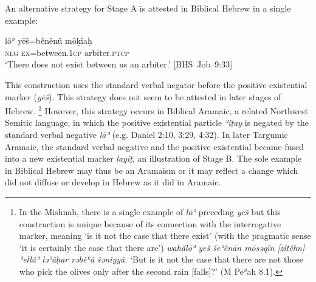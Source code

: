 ﻿\documentclass[output=paper]{langsci/langscibook}
\begin{document}
%
An alternative strategy for Stage A is attested in Biblical Hebrew in a single example:
%
\begin{exe}\ex \label{ex:heb-arbiter} \gll lôʾ yēš=bênênû môḵîaḥ \\
\textsc{neg} \textsc{ex}=between.\textsc{1cp}  arbiter.\textsc{ptcp} \\
\glt `There does not exist between us an arbiter.'
\mbox{[BHS Job 9:33]} \end{exe}
%
This construction uses the standard verbal negator before the positive
existential marker (\textit{yēš}). This strategy does not seem to be
attested in later stages of Hebrew.%
%
    \footnote{In the Mishnah, there is a single example of \textit{lōʾ}
    preceding \textit{yēš} but this construction is unique because of its
    connection with the interrogative marker, meaning `is it not the case
    that there exist' (with the pragmatic sense `it is certainly the case
    that there are') \textit{wahălōʾ yeš šeʾênān
    mōsǝqîn [zîṯêhn] ʾellāʾ ləʾāḥar
    rəḇêʿâ šənîyyâ.} `But is it not the case that there
    are not those who pick the olives only after the second rain [falls]?'
    (M Peʾah 8.1).} %
%
However, this strategy occurs in Biblical Aramaic, a related Northwest
Semitic language, in which the positive existential particle \textit{ʾîṯay}
is negated by the standard verbal negative \textit{lāʾ} (e.g. Daniel 2:10,
3:29, 4:32). In later Targumic Aramaic, the standard verbal negative and
the positive existential became fused into a new existential marker
\textit{layiṯ}, an illustration of Stage B. The sole example in Biblical
Hebrew may thus be an Aramaism \parencite[see][xlvi-xlvii]{DriverGray1921} or
it may reflect a change which did not diffuse or develop in Hebrew as it
did in Aramaic.
\end{document}

